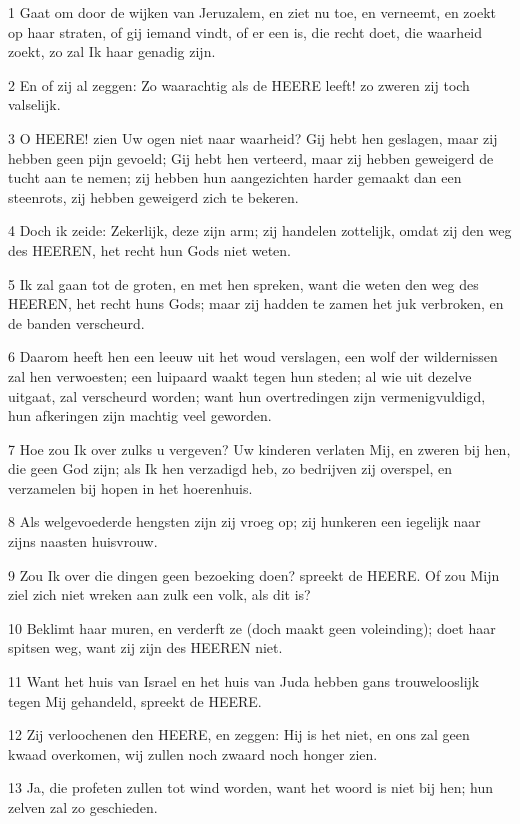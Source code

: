 \par 1 Gaat om door de wijken van Jeruzalem, en ziet nu toe, en verneemt, en zoekt op haar straten, of gij iemand vindt, of er een is, die recht doet, die waarheid zoekt, zo zal Ik haar genadig zijn.
\par 2 En of zij al zeggen: Zo waarachtig als de HEERE leeft! zo zweren zij toch valselijk.
\par 3 O HEERE! zien Uw ogen niet naar waarheid? Gij hebt hen geslagen, maar zij hebben geen pijn gevoeld; Gij hebt hen verteerd, maar zij hebben geweigerd de tucht aan te nemen; zij hebben hun aangezichten harder gemaakt dan een steenrots, zij hebben geweigerd zich te bekeren.
\par 4 Doch ik zeide: Zekerlijk, deze zijn arm; zij handelen zottelijk, omdat zij den weg des HEEREN, het recht hun Gods niet weten.
\par 5 Ik zal gaan tot de groten, en met hen spreken, want die weten den weg des HEEREN, het recht huns Gods; maar zij hadden te zamen het juk verbroken, en de banden verscheurd.
\par 6 Daarom heeft hen een leeuw uit het woud verslagen, een wolf der wildernissen zal hen verwoesten; een luipaard waakt tegen hun steden; al wie uit dezelve uitgaat, zal verscheurd worden; want hun overtredingen zijn vermenigvuldigd, hun afkeringen zijn machtig veel geworden.
\par 7 Hoe zou Ik over zulks u vergeven? Uw kinderen verlaten Mij, en zweren bij hen, die geen God zijn; als Ik hen verzadigd heb, zo bedrijven zij overspel, en verzamelen bij hopen in het hoerenhuis.
\par 8 Als welgevoederde hengsten zijn zij vroeg op; zij hunkeren een iegelijk naar zijns naasten huisvrouw.
\par 9 Zou Ik over die dingen geen bezoeking doen? spreekt de HEERE. Of zou Mijn ziel zich niet wreken aan zulk een volk, als dit is?
\par 10 Beklimt haar muren, en verderft ze (doch maakt geen voleinding); doet haar spitsen weg, want zij zijn des HEEREN niet.
\par 11 Want het huis van Israel en het huis van Juda hebben gans trouwelooslijk tegen Mij gehandeld, spreekt de HEERE.
\par 12 Zij verloochenen den HEERE, en zeggen: Hij is het niet, en ons zal geen kwaad overkomen, wij zullen noch zwaard noch honger zien.
\par 13 Ja, die profeten zullen tot wind worden, want het woord is niet bij hen; hun zelven zal zo geschieden.
